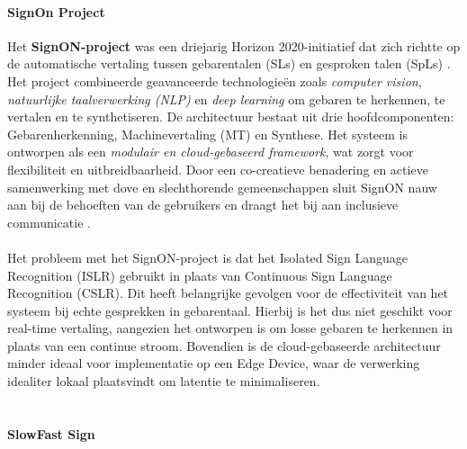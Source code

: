 \paragraph{SignOn Project}
Het \textbf{SignON-project} was een driejarig Horizon 2020-initiatief dat zich richtte op de automatische vertaling tussen gebarentalen (SLs) en gesproken talen (SpLs) \citep{shterionov-etal-2024-signon}.
Het project combineerde geavanceerde technologieën zoals \textit{computer vision}, \textit{natuurlijke taalverwerking (NLP)} en \textit{deep learning} om gebaren te herkennen, te vertalen en te synthetiseren.
De architectuur bestaat uit drie hoofdcomponenten: Gebarenherkenning, Machinevertaling (MT) en Synthese. Het systeem is ontworpen als een \textit{modulair en cloud-gebaseerd framework}, wat zorgt voor flexibiliteit en uitbreidbaarheid. Door een co-creatieve benadering en actieve samenwerking met dove en slechthorende gemeenschappen sluit SignON nauw aan bij de behoeften van de gebruikers en draagt het bij aan inclusieve communicatie \citep{shterionov-etal-2024-signon}.
\\
\\
Het probleem met het SignON-project is dat het Isolated Sign Language Recognition (ISLR) gebruikt in plaats van Continuous Sign Language Recognition (CSLR).
Dit heeft belangrijke gevolgen voor de effectiviteit van het systeem bij echte gesprekken in gebarentaal.
Hierbij is het dus niet geschikt voor real-time vertaling, aangezien het ontworpen is om losse gebaren te herkennen in plaats van een continue stroom. Bovendien is de cloud-gebaseerde architectuur minder ideaal voor implementatie op een Edge Device, waar de verwerking idealiter lokaal plaatsvindt om latentie te minimaliseren.
\\
\\
\paragraph{SlowFast Sign}

